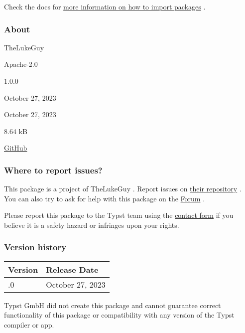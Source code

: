 

Check the docs for
\href{https://typst.app/docs/reference/scripting/\#packages}{more
information on how to import packages} .

\subsubsection{About}\label{about}

\begin{description}
\tightlist
\item[Author :]
TheLukeGuy
\item[License:]
Apache-2.0
\item[Current version:]
1.0.0
\item[Last updated:]
October 27, 2023
\item[First released:]
October 27, 2023
\item[Archive size:]
8.64 kB
\href{https://packages.typst.org/preview/backtrack-1.0.0.tar.gz}{\pandocbounded{}}
\item[Repository:]
\href{https://github.com/TheLukeGuy/backtrack}{GitHub}
\end{description}

\subsubsection{Where to report issues?}\label{where-to-report-issues}

This package is a project of TheLukeGuy . Report issues on
\href{https://github.com/TheLukeGuy/backtrack}{their repository} . You
can also try to ask for help with this package on the
\href{https://forum.typst.app}{Forum} .

Please report this package to the Typst team using the
\href{https://typst.app/contact}{contact form} if you believe it is a
safety hazard or infringes upon your rights.

\label{versions}
\subsubsection{Version history}\label{version-history}

\begin{longtable}[]{@{}ll@{}}
\toprule\noalign{}
Version & Release Date \\
\midrule\noalign{}
\endhead
\bottomrule\noalign{}
\endlastfoot
1.0.0 & October 27, 2023 \\
\end{longtable}

Typst GmbH did not create this package and cannot guarantee correct
functionality of this package or compatibility with any version of the
Typst compiler or app.
